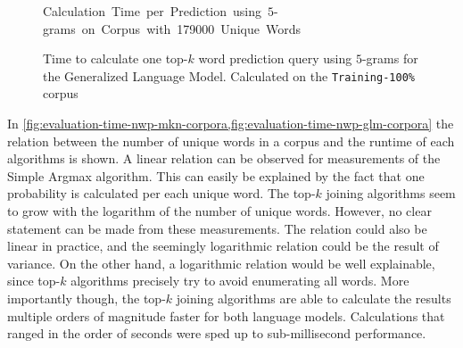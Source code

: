 \begin{figure}[p!]
  \small
  \vspace{-3ex}
  \begin{center}
    \mbox{\hspace{-0.8cm}Calculation Time per Prediction using $5$-grams on Corpus with \num{179000} Unique Words}
  \end{center}

  \vspace{-0.2cm}
  \hspace{-0.16\textwidth}
  \normalsize
  \caption{Time to calculate one top-$k$ word prediction query using $5$-grams
    for the Generalized Language Model. Calculated on the
    \texttt{Training-100\%} corpus}
  \label{fig:evaluation-time-nwp-glm-predictions}
\end{figure}

In \cref{fig:evaluation-time-nwp-mkn-corpora,fig:evaluation-time-nwp-glm-corpora}
the relation between the number of unique words in a corpus and the runtime of
each algorithms is shown.
A linear relation can be observed for measurements of the Simple Argmax
algorithm.
This can easily be explained by the fact that one probability is calculated per
each unique word.
The top-$k$ joining algorithms seem to grow with the logarithm of the number of
unique words.
However, no clear statement can be made from these measurements.
The relation could also be linear in practice, and the seemingly logarithmic
relation could be the result of variance.
On the other hand, a logarithmic relation would be well explainable, since
top-$k$ algorithms precisely try to avoid enumerating all words.
More importantly though, the top-$k$ joining algorithms are able to calculate
the results multiple orders of magnitude faster for both language models.
Calculations that ranged in the order of seconds were sped up to
sub-millisecond performance.

